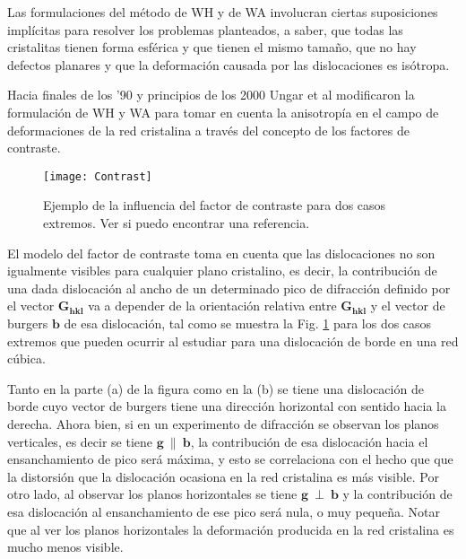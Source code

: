 Las formulaciones del método de WH y de WA involucran ciertas suposiciones implícitas para resolver los problemas planteados, a saber, que todas las cristalitas tienen forma esférica y que tienen el mismo tamaño, que no hay defectos planares y que la deformación causada por las dislocaciones es isótropa. 

Hacia finales de los '90 y principios de los 2000 Ungar et al modificaron la formulación de WH y WA para tomar en cuenta la anisotropía en el campo de deformaciones de la red cristalina a través del concepto de los factores de contraste.

\begin{figure}[!htb]
  \centering
  \texttt{[image: Contrast]}
  \caption{Ejemplo de la influencia del factor de contraste para dos casos extremos. Ver si puedo encontrar una referencia.}
  \label{fig:contrast}
\end{figure}

El modelo del factor de contraste toma en cuenta que las dislocaciones no son igualmente visibles para cualquier plano cristalino, es decir, la contribución de una dada dislocación al ancho de un determinado pico de difracción definido por el vector $\mathbf{G_{hkl}}$ va a depender de la orientación relativa entre $\mathbf{G_{hkl}}$ y el vector de burgers $\mathbf{b}$ de esa dislocación, tal como se muestra la Fig. \ref{fig:contrast} para los dos casos extremos que pueden ocurrir al estudiar para una dislocación de borde en una red cúbica.

Tanto en la parte (a) de la figura como en la (b) se tiene una dislocación de borde cuyo vector de burgers tiene una dirección horizontal con sentido hacia la derecha. 
Ahora bien, si en un experimento de difracción se observan los planos verticales, es decir se tiene $\mathbf{g} \ \parallel \ \mathbf{b}$, la contribución de esa dislocación hacia el ensanchamiento de pico será máxima, y esto se correlaciona con el hecho que que la distorsión que la dislocación ocasiona en la red cristalina es más visible.
Por otro lado, al observar los planos horizontales se tiene $\mathbf{g} \ \perp \ \mathbf{b}$ y la contribución de esa dislocación al ensanchamiento de ese pico será nula, o muy pequeña.
Notar que al ver los planos horizontales la deformación producida en la red cristalina es mucho menos visible.

